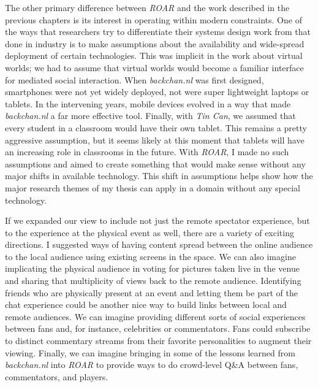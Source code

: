 The other primary difference between \emph{ROAR} and the work described in the previous chapters is its interest in operating within modern constraints. One of the ways that researchers try to differentiate their systems design work from that done in industry is to make assumptions about the availability and wide-spread deployment of certain technologies. This was implicit in the work about virtual worlds; we had to assume that virtual worlds would become a familiar interface for mediated social interaction. When \emph{backchan.nl} was first designed, smartphones were not yet widely deployed, not were super lightweight laptops or tablets. In the intervening years, mobile devices evolved in a way that made \emph{backchan.nl} a far more effective tool. Finally, with \emph{Tin Can}, we assumed that every student in a classroom would have their own tablet. This remains a pretty aggressive assumption, but it seems likely at this moment that tablets will have an increasing role in classrooms in the future. With \emph{ROAR}, I made no such assumptions and aimed to create something that would make sense without any major shifts in available technology. This shift in assumptions helps show how the major research themes of my thesis can apply in a domain without any special technology.

If we expanded our view to include not just the remote spectator experience, but to the experience at the physical event as well, there are a variety of exciting directions. I suggested ways of having content spread between the online audience to the local audience using existing screens in the space. We can also imagine implicating the physical audience in voting for pictures taken live in the venue and sharing that multiplicity of views back to the remote audience. Identifying friends who are physically present at an event and letting them be part of the chat experience could be another nice way to build links between local and remote audiences. We can imagine providing different sorts of social experiences between fans and, for instance, celebrities or commentators. Fans could subscribe to distinct  commentary streams from their favorite personalities to augment their viewing. Finally, we can imagine bringing in some of the lessons learned from \emph{backchan.nl}  into \emph{ROAR} to provide ways to do crowd-level Q&A between fans, commentators, and players. 






	
